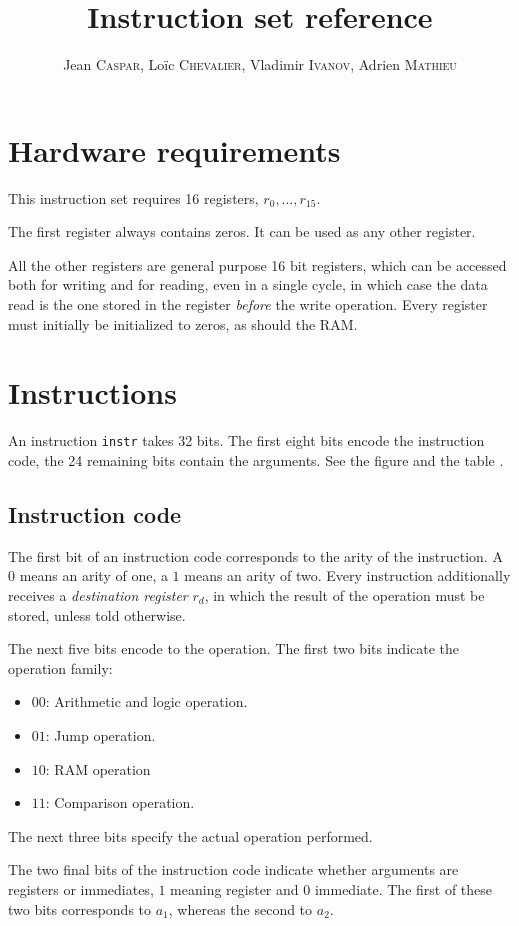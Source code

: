 \documentclass{scrartcl}
\title{Instruction set reference}
\author{%
  Jean \textsc{Caspar},
  Loïc \textsc{Chevalier},
  Vladimir \textsc{Ivanov},
  Adrien \textsc{Mathieu}
}
\date{}
\begin{document}
\maketitle{}
\section*{Hardware requirements}
This instruction set requires 16 registers, \(r_0,\ldots,r_{15}\).\par
The first register always contains zeros. It can be used as any other register.\par
All the other registers are general purpose 16 bit registers, which can be
accessed both for writing and for reading, even in a single cycle, in which case
the data read is the one stored in the register \textit{before} the write
operation. Every register must initially be initialized to zeros, as should the
RAM.

\section*{Instructions}
An instruction \verb|instr| takes 32 bits. The first eight bits encode the
instruction code, the 24 remaining bits contain the arguments. See
the figure  and the table .
\subsection*{Instruction code}
The first bit of an instruction code corresponds to the arity of the instruction.
A $0$ means an arity of one, a $1$ means an arity of two. Every instruction
additionally receives a \emph{destination register} $r_d$, in which the result of
the operation must be stored, unless told otherwise.\par
The next five bits encode to the operation. The first two bits indicate the
operation family:
\begin{itemize}
\item $00$: Arithmetic and logic operation.
\item $01$: Jump operation.
\item $10$: RAM operation
\item $11$: Comparison operation.
\end{itemize}
The next three bits specify the actual operation performed.\par
The two final bits of the instruction code indicate whether arguments are
registers or immediates, $1$ meaning register and $0$ immediate. The first of
these two bits corresponds to $a_1$, whereas the second to $a_2$.
\end{document}
